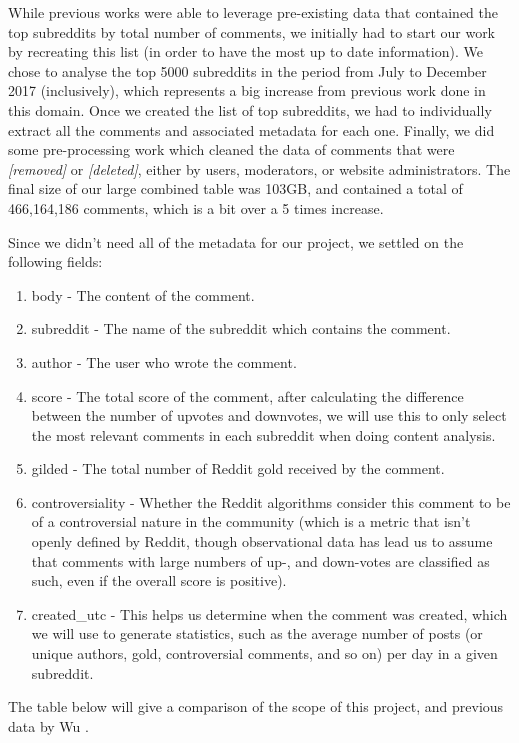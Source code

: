 \documentclass[bsc,frontabs,twoside,singlespacing,parskip,deptreport]{infthesis}
\begin{document}
While previous works were able to leverage pre-existing data that contained the top subreddits by total number of comments, we initially had to start our work by recreating this list (in order to have the most up to date information). We chose to analyse the top 5000 subreddits in the period from July to December 2017 (inclusively), which represents a big increase from previous work done in this domain. Once we created the list of top subreddits, we had to individually extract all the comments and associated metadata for each one. Finally, we did some pre-processing work which cleaned the data of comments that were \textit{[removed]} or \textit{[deleted]}, either by users, moderators, or website administrators. The final size of our large combined table was 103GB, and contained a total of 466,164,186 comments, which is a bit over a 5 times increase.

Since we didn't need all of the metadata for our project, we settled on the following fields: 

\begin{enumerate}
  \item body - The content of the comment.
  \item subreddit - The name of the subreddit which contains the comment.
  \item author - The user who wrote the comment.
  \item score - The total score of the comment, after calculating the difference between the number of upvotes and downvotes, we will use this to only select the most relevant comments in each subreddit when doing content analysis.
  \item gilded - The total number of Reddit gold received by the comment.
  \item controversiality - Whether the Reddit algorithms consider this comment to be of a controversial nature in the community (which is a metric that isn't openly defined by Reddit, though observational data has lead us to assume that comments with large numbers of up-, and down-votes are classified as such, even if the overall score is positive).
  \item created\_utc - This helps us determine when the comment was created, which we will use to generate statistics, such as the average number of posts (or unique authors, gold, controversial comments, and so on) per day in a given subreddit.
\end{enumerate}

The table below will give a comparison of the scope of this project, and previous data by Wu \cite{masters}.
\end{document}
